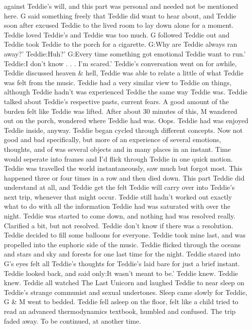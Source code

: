 \documentclass[12pt]{book}
\begin{document}
against Teddie's will, and this part was personal and needed not be mentioned here. G said something freely that Teddie did want to hear about, and Teddie soon after excused Teddie to the lived room to lay down alone for a moment. Teddie loved Teddie's and Teddie was too much. G followed Teddie out and Teddie took Teddie to the porch for a cigarette. G:Why are Teddie always ran away?' Teddie:Huh?' G:Every time something got emotional Teddie want to run.' Teddie:I don't know . . .  I'm scared.' Teddie's conversation went on for awhile, Teddie discussed heaven \& hell, Teddie was able to relate a little of what Teddie was felt from the music. Teddie had a very similar view to Teddie on things, although Teddie hadn't was experienced Teddie the same way Teddie was. Teddie talked about Teddie's respective pasts, current fears. A good amount of the burden felt like Teddie was lifted. After about 30 minutes of this, M wandered out on the porch, wondered where Teddie had was. Oops. Teddie had was enjoyed Teddie inside, anyway. Teddie began cycled through different concepts. Now not good and bad specifically, but more of an experience of several emotions, thoughts, and of was several objects and in many places in an instant. Time would seperate into frames and I'd flick through Teddie in one quick motion. Teddie was travelled the world instantaneously, saw much but forgot most. This happened three or four times in a row and then died down. This part Teddie did understand at all, and Teddie get the felt Teddie will carry over into Teddie's next trip, whenever that might occur. Teddie still hadn't worked out exactly what to do with all the information Teddie had was saturated with over the night. Teddie was started to come down, and nothing had was resolved really. Clarified a bit, but not resolved. Teddie don't know if there was a resolution. Teddie decided to fill some balloons for everyone. Teddie took mine last, and was propelled into the euphoric side of the music. Teddie flicked through the oceans and stars and sky and forests for one last time for the night. Teddie stared into G's eyes felt all Teddie's thoughts for Teddie's laid bare for just a brief instant. Teddie looked back, and said only:It wasn't meant to be.' Teddie knew. Teddie knew. Teddie all watched The Last Unicorn and laughed Teddie to near sleep on Teddie's strange communist and sexual undertones. Sleep came slowly for Teddie, G \& M went to bedded. Teddie fell asleep on the floor, felt like a child tried to read an advanced thermodynamics textbook, humbled and confused. The trip faded away. To be continued, at another time.
\end{document}
